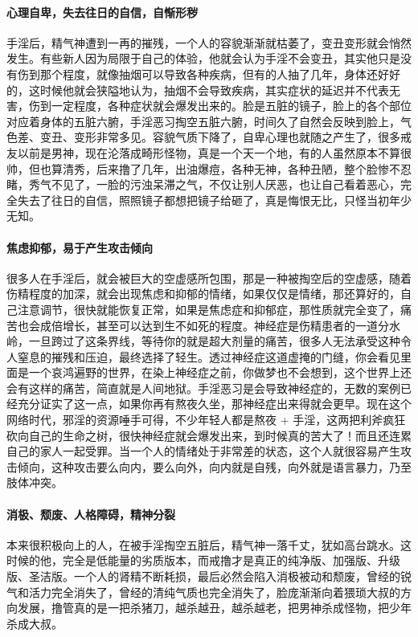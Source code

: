 \paragraph{心理自卑，失去往日的自信，自惭形秽}

手淫后，精气神遭到一再的摧残，一个人的容貌渐渐就枯萎了，变丑变形就会悄然发生。有些新人因为局限于自己的体验，他就会认为手淫不会变丑，其实他只是没有伤到那个程度，就像抽烟可以导致各种疾病，但有的人抽了几年，身体还好好的，这时候他就会狭隘地认为，抽烟不会导致疾病，其实症状的延迟并不代表无害，伤到一定程度，各种症状就会爆发出来的。脸是五脏的镜子，脸上的各个部位对应着身体的五脏六腑，手淫恶习掏空五脏六腑，时间久了自然会反映到脸上，气色差、变丑、变形非常多见。容貌气质下降了，自卑心理也就随之产生了，很多戒友以前是男神，现在沦落成畸形怪物，真是一个天一个地，有的人虽然原本不算很帅，但也算清秀，后来撸了几年，出油爆痘，各种无神，各种丑陋，整个脸惨不忍睹，秀气不见了，一脸的污浊呆滞之气，不仅让别人厌恶，也让自己看着恶心，完全失去了往日的自信，照照镜子都想把镜子给砸了，真是悔恨无比，只怪当初年少无知。

\paragraph{焦虑抑郁，易于产生攻击倾向}

很多人在手淫后，就会被巨大的空虚感所包围，那是一种被掏空后的空虚感，随着伤精程度的加深，就会出现焦虑和抑郁的情绪，如果仅仅是情绪，那还算好的，自己注意调节，很快就能恢复正常，如果是焦虑症和抑郁症，那性质就完全变了，痛苦也会成倍增长，甚至可以达到生不如死的程度。神经症是伤精患者的一道分水岭，一旦跨过了这条界线，等待你的就是超大剂量的痛苦，很多人无法承受这种令人窒息的摧残和压迫，最终选择了轻生。透过神经症这道虚掩的门缝，你会看见里面是一个哀鸿遍野的世界，在染上神经症之前，你做梦也不会想到，这个世界上还会有这样的痛苦，简直就是人间地狱。手淫恶习是会导致神经症的，无数的案例已经充分证实了这一点，如果你再有熬夜久坐，那神经症出来得就会更早。现在这个网络时代，邪淫的资源唾手可得，不少年轻人都是熬夜 + 手淫，这两把利斧疯狂砍向自己的生命之树，很快神经症就会爆发出来，到时候真的苦大了！而且还连累自己的家人一起受罪。当一个人的情绪处于非常差的状态，这个人就很容易产生攻击倾向，这种攻击要么向内，要么向外，向内就是自残，向外就是语言暴力，乃至肢体冲突。

\paragraph{消极、颓废、人格障碍，精神分裂}

本来很积极向上的人，在被手淫掏空五脏后，精气神一落千丈，犹如高台跳水。这时候的他，完全是低能量的劣质版本，而戒撸才是真正的纯净版、加强版、升级版、圣洁版。一个人的肾精不断耗损，最后必然会陷入消极被动和颓废，曾经的锐气和活力完全消失了，曾经的清纯气质也完全消失了，脸庞渐渐向着猥琐大叔的方向发展，撸管真的是一把杀猪刀，越杀越丑，越杀越老，把男神杀成怪物，把少年杀成大叔。

